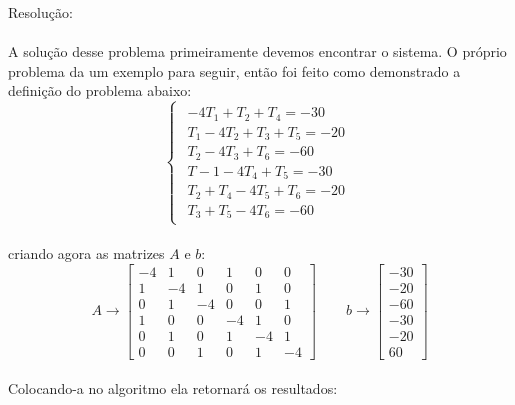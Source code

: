 \documentclass[
	12pt,				%
	openright,			%
	twoside,			%
	a4paper,			%
	english,			%
	french,				%
	spanish,			%
	brazil				%
	]{abntex2_new}
\begin{document}
 Resolução:\\
 \\
 A solução desse problema primeiramente devemos encontrar o sistema. O próprio problema
 da um exemplo para seguir, então foi feito como demonstrado a definição do problema abaixo:\\
$$\begin{cases}
\begin{aligned}
-4T_1+T_2+T_4=-30\\
T_1-4T_2+T_3+T_5=-20\\
T_2-4T_3+T_6=-60\\
T-1-4T_4+T_5=-30\\
T_2+T_4-4T_5+T_6=-20\\
T_3+T_5-4T_6=-60
\end{aligned}
 \end{cases}$$\\
 criando agora as matrizes $A$ e $b$:\\
 $$	A \rightarrow   \begin{bmatrix}
 -4 & 1 & 0 & 1 & 0 & 0 \\
  1 & -4 & 1 & 0 & 1 & 0 \\
  0 & 1 & -4 & 0 & 0 & 1 \\
  1 & 0 & 0 & -4 & 1 & 0 \\
  0 & 1 & 0 & 1 & -4 & 1 \\
  0 & 0 & 1 & 0 & 1 & -4 
 \end{bmatrix} \hspace{25pt}
 b \rightarrow  \begin{bmatrix}
 -30\\
 -20\\
 -60\\
 -30\\
 -20\\
 60
 \end{bmatrix}
 $$\\
 
 Colocando-a no algoritmo ela retornará os resultados:
 
\end{document}
